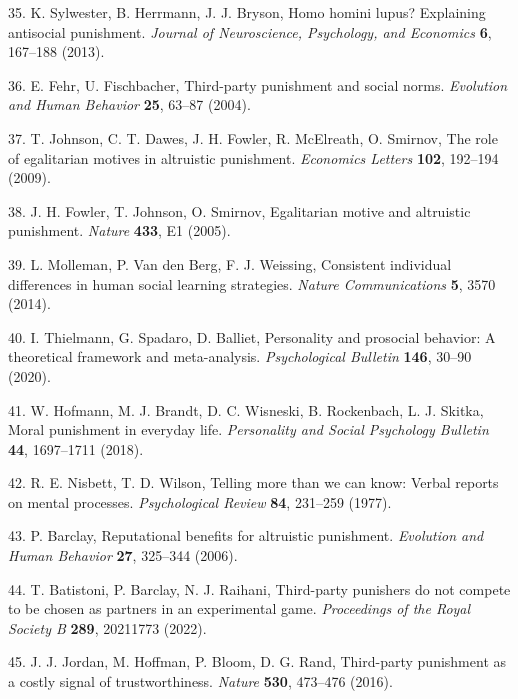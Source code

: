 \documentclass[
  english,
  man, donotrepeattitle,floatsintext]{apa6}
\newenvironment{cslreferences}%
  {}%
  {\par}
\begin{document}
\begin{cslreferences}
\leavevmode\hypertarget{ref-Sylwester2013}{}%
35. K. Sylwester, B. Herrmann, J. J. Bryson, Homo homini lupus? Explaining antisocial punishment. \emph{Journal of Neuroscience, Psychology, and Economics} \textbf{6}, 167--188 (2013).

\leavevmode\hypertarget{ref-Fehr2004}{}%
36. E. Fehr, U. Fischbacher, Third-party punishment and social norms. \emph{Evolution and Human Behavior} \textbf{25}, 63--87 (2004).

\leavevmode\hypertarget{ref-Johnson2009}{}%
37. T. Johnson, C. T. Dawes, J. H. Fowler, R. McElreath, O. Smirnov, The role of egalitarian motives in altruistic punishment. \emph{Economics Letters} \textbf{102}, 192--194 (2009).

\leavevmode\hypertarget{ref-Fowler2005}{}%
38. J. H. Fowler, T. Johnson, O. Smirnov, Egalitarian motive and altruistic punishment. \emph{Nature} \textbf{433}, E1 (2005).

\leavevmode\hypertarget{ref-Molleman2014}{}%
39. L. Molleman, P. Van den Berg, F. J. Weissing, Consistent individual differences in human social learning strategies. \emph{Nature Communications} \textbf{5}, 3570 (2014).

\leavevmode\hypertarget{ref-Thielmann2020}{}%
40. I. Thielmann, G. Spadaro, D. Balliet, Personality and prosocial behavior: A theoretical framework and meta-analysis. \emph{Psychological Bulletin} \textbf{146}, 30--90 (2020).

\leavevmode\hypertarget{ref-Hofmann2018}{}%
41. W. Hofmann, M. J. Brandt, D. C. Wisneski, B. Rockenbach, L. J. Skitka, Moral punishment in everyday life. \emph{Personality and Social Psychology Bulletin} \textbf{44}, 1697--1711 (2018).

\leavevmode\hypertarget{ref-Nisbett1977}{}%
42. R. E. Nisbett, T. D. Wilson, Telling more than we can know: Verbal reports on mental processes. \emph{Psychological Review} \textbf{84}, 231--259 (1977).

\leavevmode\hypertarget{ref-Barclay2006}{}%
43. P. Barclay, Reputational benefits for altruistic punishment. \emph{Evolution and Human Behavior} \textbf{27}, 325--344 (2006).

\leavevmode\hypertarget{ref-Batistoni2022}{}%
44. T. Batistoni, P. Barclay, N. J. Raihani, Third-party punishers do not compete to be chosen as partners in an experimental game. \emph{Proceedings of the Royal Society B} \textbf{289}, 20211773 (2022).

\leavevmode\hypertarget{ref-Jordan2016}{}%
45. J. J. Jordan, M. Hoffman, P. Bloom, D. G. Rand, Third-party punishment as a costly signal of trustworthiness. \emph{Nature} \textbf{530}, 473--476 (2016).


\end{cslreferences}
\end{document}
